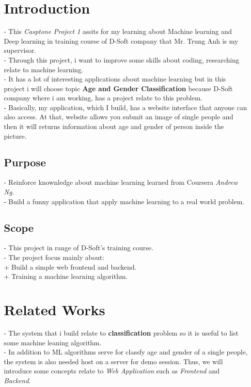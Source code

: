
\usepackage{amsmath}
\usepackage{graphicx}
\graphicspath{ {./figs/} }

\maketitle
\newpage

\tableofcontents
\newpage
\section{Introduction}
- This \textit{Casptone Project 1} assits for my learning about Machine learning and Deep learning in training course of D-Soft company that Mr. Trung Anh is my supervisor. \\
- Through this project, i want to improve some skills about coding, researching relate to machine learning.\\
- It has a lot of interesting applications about machine learning but in this project i will choose topic \textbf{Age and Gender Classification} because D-Soft company where i am working, has a project relate to this problem.\\
- Basically, my application, which I build, has a website interface that anyone can also access. At that, website allows you submit an image of single people and then it will returns information about age and gender of person inside the picture.\\

\subsection{Purpose}
- Reinforce knownledge about machine learning learned from Coursera \textit{Andrew Ng.}\\
- Build a funny application that apply machine learning to a real world problem.
\subsection{Scope}
- This project in range of D-Soft's training course.\\
- The project focus mainly about: \\
\indent + Build a simple web frontend and backend. \\
\indent + Training a machine learning algorithm.

\newpage
\section{Related Works}
- The system that i build relate to \textbf{classification} problem so it is useful to list some machine leaning algorithm.\\
- In addition to ML algorithms serve for classfy age and gender of a single people, the system is also needed host on a server for demo session. Thus, we will introduce some concepts relate to \textit{Web Application} such as \textit{Frontend} and \textit{Backend}.
